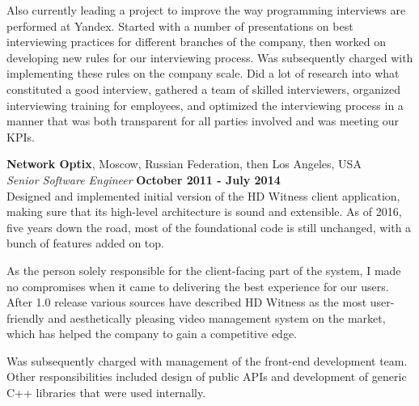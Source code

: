 \documentclass[margin,line]{CV}
\begin{document}
\begin{resume}
    Also currently leading a project to improve the way programming interviews are performed at Yandex. Started with a number of presentations on best interviewing practices for different branches of the company, then worked on developing new rules for our interviewing process. Was subsequently charged with implementing these rules on the company scale. Did a lot of research into what constituted a good interview, gathered a team of skilled interviewers, organized interviewing training for employees, and optimized the interviewing process in a manner that was both transparent for all parties involved and was meeting our KPIs.

    
    
    \textbf{Network Optix}, Moscow, Russian Federation, then Los Angeles, USA \vspace{2mm}\\\vspace{1mm}%
    \textsl{Senior Software Engineer} \hfill \textbf{October 2011 - July 2014}\\ 
    Designed and implemented initial version of the HD Witness client application, making sure that its high-level architecture is sound and extensible. As of 2016, five years down the road, most of the foundational code is still unchanged, with a bunch of features added on top.
    
    As the person solely responsible for the client-facing part of the system, I made no compromises when it came to delivering the best experience for our users. After 1.0 release various sources have described HD Witness as the most user-friendly and aesthetically pleasing video management system on the market, which has helped the company to gain a competitive edge.
    
    Was subsequently charged with management of the front-end development team. Other responsibilities included design of public APIs and development of generic C++ libraries that were used internally.
    
    


\end{resume}
\end{document}

